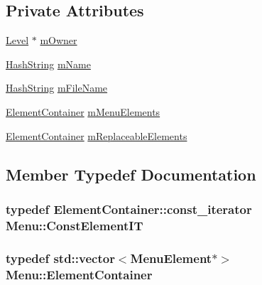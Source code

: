 \subsection*{Private Attributes}
\begin{DoxyCompactItemize}
\item 
\hyperlink{classLevel}{Level} $\ast$ \hyperlink{classMenu_a36358711e2674ecda672dc659aaf0473}{m\+Owner}
\item 
\hyperlink{classHashString}{Hash\+String} \hyperlink{classMenu_a9e454ad9bc527d746ccbb27de87d1181}{m\+Name}
\item 
\hyperlink{classHashString}{Hash\+String} \hyperlink{classMenu_abab37e282704993641ee4acd9f6fa30d}{m\+File\+Name}
\item 
\hyperlink{classMenu_af1e1ac12e9eab661af646964b15edf54}{Element\+Container} \hyperlink{classMenu_a971cf9e8a9251bc7d758b7822659a022}{m\+Menu\+Elements}
\item 
\hyperlink{classMenu_af1e1ac12e9eab661af646964b15edf54}{Element\+Container} \hyperlink{classMenu_a1ff659d527f6648207ae7045a9b58ab6}{m\+Replaceable\+Elements}
\end{DoxyCompactItemize}


\subsection{Member Typedef Documentation}
\subsubsection[{\texorpdfstring{Const\+Element\+IT}{ConstElementIT}}]{\setlength{\rightskip}{0pt plus 5cm}typedef Element\+Container\+::const\+\_\+iterator {\bf Menu\+::\+Const\+Element\+IT}}\hypertarget{classMenu_a5dc61431574d6de0558ba3e6c33fcfb8}{}\label{classMenu_a5dc61431574d6de0558ba3e6c33fcfb8}
\subsubsection[{\texorpdfstring{Element\+Container}{ElementContainer}}]{\setlength{\rightskip}{0pt plus 5cm}typedef std\+::vector$<${\bf Menu\+Element}$\ast$$>$ {\bf Menu\+::\+Element\+Container}}\hypertarget{classMenu_af1e1ac12e9eab661af646964b15edf54}{}\label{classMenu_af1e1ac12e9eab661af646964b15edf54}
